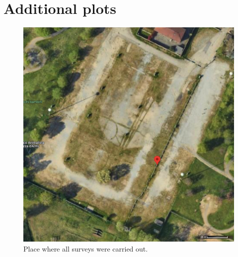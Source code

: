 \onecolumn
\section{Additional plots}
\label{sec:additional_plots}

\begin{figure}[H]
    \centering
    \includegraphics[width=0.5\linewidth]{images/map_place.png}
    \caption{Place where all surveys were carried out.}
    \label{fig:map}
\end{figure}


